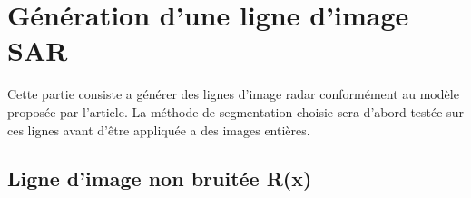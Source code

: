 \documentclass[a4paper,11pt]{article}
\begin{document}
\section{Génération d'une ligne d'image SAR}

Cette partie consiste a générer des lignes d'image radar conformément au modèle proposée par l'article. La méthode de segmentation choisie sera d'abord testée sur ces lignes
avant d'être appliquée a des images entières.

\subsection{Ligne d'image non bruitée R(x)}
\end{document}
